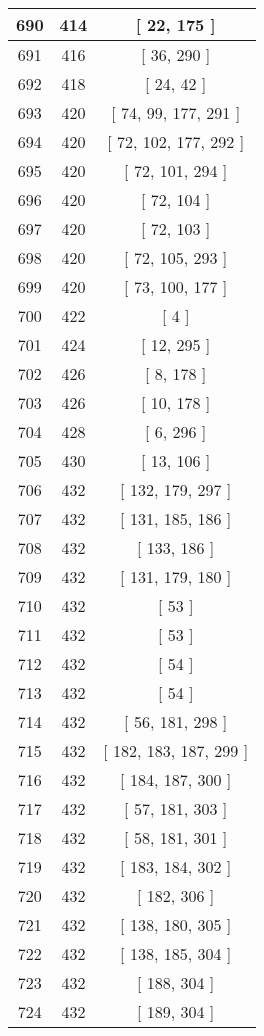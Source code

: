 \begin{center}
\begin{longtable}[H]{|| c c c ||}
690 & 414 & [ 22, 175 ]
\\\hline
691 & 416 & [ 36, 290 ]
\\\hline
692 & 418 & [ 24, 42 ]
\\\hline
693 & 420 & [ 74, 99, 177, 291 ]
\\\hline
694 & 420 & [ 72, 102, 177, 292 ]
\\\hline
695 & 420 & [ 72, 101, 294 ]
\\\hline
696 & 420 & [ 72, 104 ]
\\\hline
697 & 420 & [ 72, 103 ]
\\\hline
698 & 420 & [ 72, 105, 293 ]
\\\hline
699 & 420 & [ 73, 100, 177 ]
\\\hline
700 & 422 & [ 4 ]
\\\hline
701 & 424 & [ 12, 295 ]
\\\hline
702 & 426 & [ 8, 178 ]
\\\hline
703 & 426 & [ 10, 178 ]
\\\hline
704 & 428 & [ 6, 296 ]
\\\hline
705 & 430 & [ 13, 106 ]
\\\hline
706 & 432 & [ 132, 179, 297 ]
\\\hline
707 & 432 & [ 131, 185, 186 ]
\\\hline
708 & 432 & [ 133, 186 ]
\\\hline
709 & 432 & [ 131, 179, 180 ]
\\\hline
710 & 432 & [ 53 ]
\\\hline
711 & 432 & [ 53 ]
\\\hline
712 & 432 & [ 54 ]
\\\hline
713 & 432 & [ 54 ]
\\\hline
714 & 432 & [ 56, 181, 298 ]
\\\hline
715 & 432 & [ 182, 183, 187, 299 ]
\\\hline
716 & 432 & [ 184, 187, 300 ]
\\\hline
717 & 432 & [ 57, 181, 303 ]
\\\hline
718 & 432 & [ 58, 181, 301 ]
\\\hline
719 & 432 & [ 183, 184, 302 ]
\\\hline
720 & 432 & [ 182, 306 ]
\\\hline
721 & 432 & [ 138, 180, 305 ]
\\\hline
722 & 432 & [ 138, 185, 304 ]
\\\hline
723 & 432 & [ 188, 304 ]
\\\hline
724 & 432 & [ 189, 304 ]
\\\hline

\end{longtable}
\end{center}
